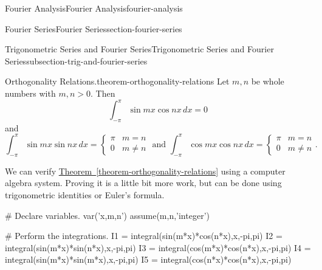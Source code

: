 \documentclass[oneside,10pt,]{book}
\numberwithin{equation}{section}
\newcommand{\amp}{&}
\begin{document}
\begin{chapterptx}{Fourier Analysis}{}{Fourier Analysis}{}{}{fourier-analysis}
\begin{sectionptx}{Fourier Series}{}{Fourier Series}{}{}{section-fourier-series}
\begin{subsectionptx}{Trigonometric Series and Fourier Series}{}{Trigonometric Series and Fourier Series}{}{}{subsection-trig-and-fourier-series}
\begin{theorem}{Orthogonality Relations.}{}{theorem-orthogonality-relations}
Let \(m,n\) be whole numbers with \(m,n>0\). Then%
\begin{equation*}
\int_{-\pi}^{\pi}\sin mx\cos nx\,dx = 0
\end{equation*}
and%
\begin{equation*}
\int_{-\pi}^{\pi}\sin mx\sin nx\,dx = \begin{cases} \pi \amp m=n \\ 0 \amp m\neq n\end{cases}\text{ and }\int_{-\pi}^{\pi}\cos mx\cos nx\,dx = \begin{cases} \pi \amp m=n \\ 0 \amp m\neq n\end{cases}\text{.}
\end{equation*}
%
\end{theorem}
\hypertarget{p-580}{}%
We can verify \hyperref[theorem-orthogonality-relations]{Theorem~\ref{theorem-orthogonality-relations}} using a computer algebra system. Proving it is a little bit more work, but can be done using trigonometric identities or Euler's formula.%
\begin{sageinput}
# Declare variables.
var('x,m,n')
assume(m,n,'integer')

# Perform the integrations.
I1 = integral(sin(m*x)*cos(n*x),x,-pi,pi)
I2 = integral(sin(m*x)*sin(n*x),x,-pi,pi)
I3 = integral(cos(m*x)*cos(n*x),x,-pi,pi)
I4 = integral(sin(m*x)*sin(m*x),x,-pi,pi)
I5 = integral(cos(n*x)*cos(n*x),x,-pi,pi)


\end{sageinput}
\end{subsectionptx}
\end{sectionptx}
\end{chapterptx}
\end{document}

